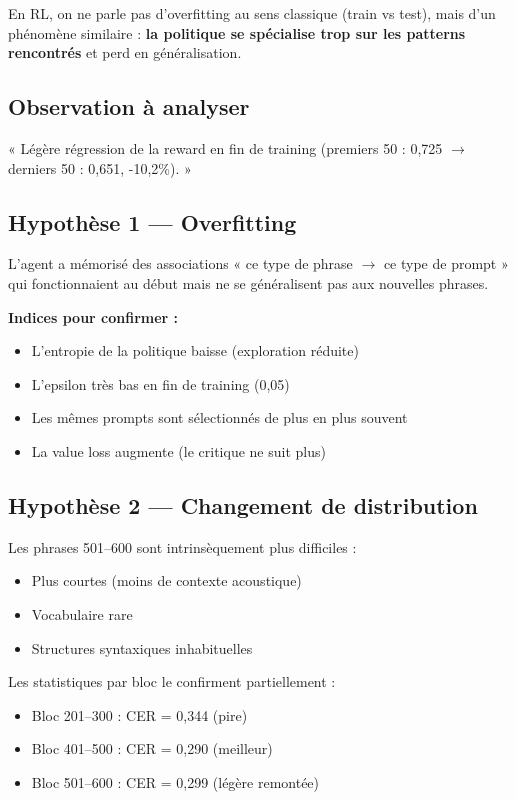 \documentclass[11pt,a4paper]{article}
\begin{document}
En RL, on ne parle pas d'overfitting au sens classique (train vs test), mais d'un phénomène similaire : \textbf{la politique se spécialise trop sur les patterns rencontrés} et perd en généralisation.

\subsection{Observation à analyser}

« Légère régression de la reward en fin de training (premiers 50 : 0{,}725 $\rightarrow$ derniers 50 : 0{,}651, -10{,}2\%). »

\subsection{Hypothèse 1 — Overfitting}

L'agent a mémorisé des associations « ce type de phrase $\rightarrow$ ce type de prompt » qui fonctionnaient au début mais ne se généralisent pas aux nouvelles phrases.

\textbf{Indices pour confirmer :}
\begin{itemize}
    \item L'entropie de la politique baisse (exploration réduite)
    \item L'epsilon très bas en fin de training (0{,}05)
    \item Les mêmes prompts sont sélectionnés de plus en plus souvent
    \item La value loss augmente (le critique ne suit plus)
\end{itemize}

\subsection{Hypothèse 2 — Changement de distribution}

Les phrases 501--600 sont intrinsèquement plus difficiles :
\begin{itemize}
    \item Plus courtes (moins de contexte acoustique)
    \item Vocabulaire rare
    \item Structures syntaxiques inhabituelles
\end{itemize}

Les statistiques par bloc le confirment partiellement :
\begin{itemize}
    \item Bloc 201--300 : CER = 0{,}344 (pire)
    \item Bloc 401--500 : CER = 0{,}290 (meilleur)
    \item Bloc 501--600 : CER = 0{,}299 (légère remontée)
\end{itemize}
\end{document}
